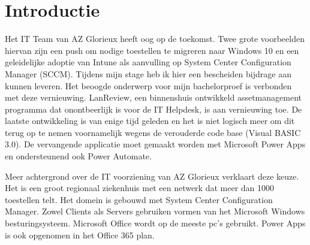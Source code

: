 
\section{Introductie} %
\label{sec:introductie}

Het IT Team van AZ Glorieux heeft oog op de toekomst. Twee grote voorbeelden hiervan zijn een push om nodige toestellen te migreren naar Windows 10 en een geleidelijke adoptie van Intune als aanvulling op System Center Configuration Manager (SCCM). Tijdens mijn stage heb ik hier een bescheiden bijdrage aan kunnen leveren. Het beoogde onderwerp voor mijn bachelorproef is verbonden met deze vernieuwing. LanReview, een binnenshuis ontwikkeld assetmanagement programma dat onontbeerlijk is voor de IT Helpdesk, is aan vernieuwing toe. De laatste ontwikkeling is van enige tijd geleden en het is niet logisch meer om dit terug op te nemen voornamelijk wegens de verouderde code base (Visual BASIC 3.0). De vervangende applicatie moet gemaakt worden met Microsoft Power Apps en ondersteunend ook Power Automate.

Meer achtergrond over de IT voorziening van AZ Glorieux verklaart deze keuze. Het is een groot regionaal ziekenhuis met een netwerk dat meer dan 1000 toestellen telt. Het domein is gebouwd met System Center Configuration Manager. Zowel Clients als Servers gebruiken vormen van het Microsoft Windows besturingsysteem. Microsoft Office wordt op de meeste pc's gebruikt. Power Apps is ook opgenomen in het Office 365 plan.

\vspace{5mm}

